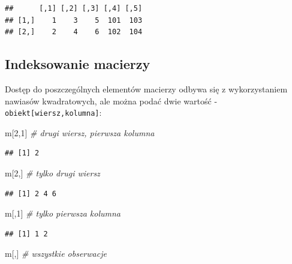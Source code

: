 \documentclass[
]{book}
\newenvironment{Shaded}{\begin{snugshade}}{\end{snugshade}}
\newcommand{\CommentTok}[1]{\textcolor[rgb]{0.56,0.35,0.01}{\textit{#1}}}
\newcommand{\DecValTok}[1]{\textcolor[rgb]{0.00,0.00,0.81}{#1}}
\newcommand{\NormalTok}[1]{#1}
\begin{document}
\begin{verbatim}
##      [,1] [,2] [,3] [,4] [,5]
## [1,]    1    3    5  101  103
## [2,]    2    4    6  102  104
\end{verbatim}

\hypertarget{indeksowanie-macierzy}{%
\subsection{Indeksowanie macierzy}\label{indeksowanie-macierzy}}

Dostęp do poszczególnych elementów macierzy odbywa się z wykorzystaniem nawiasów kwadratowych, ale można podać dwie wartość - \texttt{obiekt{[}wiersz,kolumna{]}}:

\begin{Shaded}
\begin{Highlighting}[]
\NormalTok{m[}\DecValTok{2}\NormalTok{,}\DecValTok{1}\NormalTok{] }\CommentTok{\# drugi wiersz, pierwsza kolumna}
\end{Highlighting}
\end{Shaded}

\begin{verbatim}
## [1] 2
\end{verbatim}

\begin{Shaded}
\begin{Highlighting}[]
\NormalTok{m[}\DecValTok{2}\NormalTok{,]  }\CommentTok{\# tylko drugi wiersz}
\end{Highlighting}
\end{Shaded}

\begin{verbatim}
## [1] 2 4 6
\end{verbatim}

\begin{Shaded}
\begin{Highlighting}[]
\NormalTok{m[,}\DecValTok{1}\NormalTok{]  }\CommentTok{\# tylko pierwsza kolumna}
\end{Highlighting}
\end{Shaded}

\begin{verbatim}
## [1] 1 2
\end{verbatim}

\begin{Shaded}
\begin{Highlighting}[]
\NormalTok{m[,]   }\CommentTok{\# wszystkie obserwacje}
\end{Highlighting}
\end{Shaded}
\end{document}
